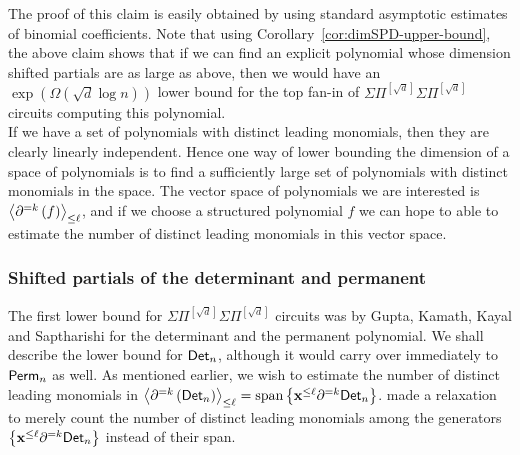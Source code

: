 \documentclass{birkjour}
\newcommand{\SPD}[3]{\inangle{\partial^{=#1}\inparen{#3}}_{\leq #2}}
\newcommand{\mySPSP}[2]{\Sigma\Pi^{[#1]}\Sigma\Pi^{[#2]}}
\providecommand{\DIFaddtex}[1]{{\protect\color{blue}\uwave{#1}}} %
\providecommand{\DIFaddbegin}{} %
\providecommand{\DIFaddend}{} %
\providecommand{\DIFadd}[1]{\texorpdfstring{\DIFaddtex{#1}}{#1}} %
\begin{document}
The proof of this claim is easily obtained by using standard asymptotic estimates of binomial coefficients. Note that using Corollary~\ref{cor:dimSPD-upper-bound}, the above claim shows that if we can find an explicit polynomial whose dimension \DIFaddbegin \DIFadd{of }\DIFaddend shifted partials are as large as above, then we would have an $\exp(\Omega(\sqrt{d}\log n))$ lower bound for the top fan-in of $\mySPSP{\sqrt{d}}{\sqrt{d}}$ circuits computing this polynomial.\\


If we have a set of polynomials with distinct leading monomials, then they are clearly linearly independent. Hence one way of lower bounding the dimension of a space of polynomials is to find a sufficiently large set of polynomials with distinct monomials in the space. The vector space of polynomials we are interested is $\SPD{k}{\ell}{f}$, and if we choose a structured polynomial $f$ we can hope to \DIFaddbegin \DIFadd{be }\DIFaddend able to estimate the number of distinct leading monomials in this vector space. 

\subsubsection{Shifted partials of the determinant and permanent}

The first lower bound for $\mySPSP{\sqrt{d}}{\sqrt{d}}$ circuits was by Gupta, Kamath, Kayal and Saptharishi \cite{gkks13} for the determinant and the permanent polynomial. We shall describe the lower bound for $\mathsf{Det}_n$, although it would carry over immediately to $\mathsf{Perm}_n$ as well. As mentioned earlier, we wish to estimate the number of distinct leading monomials in $\SPD{k}{\ell}{\Det_n} = \mathrm{span}\inbrace{\vecx^{\leq \ell}\partial^{=k}\Det_n}$. \cite{gkks13} made a relaxation to merely count the number of distinct leading monomials among the generators $\left\{\mathbf{x}^{\leq \ell}\partial^{=k}\mathsf{Det}_n\right\}$ instead of their span. \\
\end{document}
